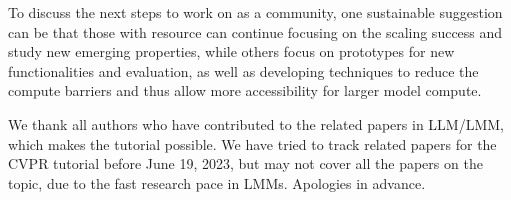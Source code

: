 \documentclass{article}
\begin{document}
To discuss the next steps to work on as a community, one sustainable suggestion can be that those with resource can continue focusing on the scaling success and study new emerging properties, while others focus on prototypes for new functionalities and evaluation, as well as developing techniques to reduce the compute barriers and thus allow more accessibility for larger model compute.


\newpage
\begin{ack}
We thank all authors who have contributed to the related papers in LLM/LMM, which makes the tutorial possible. We have tried to track related papers for the CVPR tutorial before June 19, 2023, but may not cover all the papers on the topic, due to the fast research pace in LMMs. Apologies in advance.

\end{ack}






\end{document}
